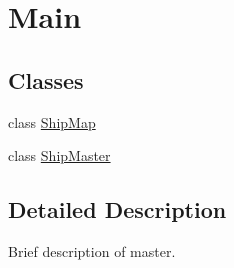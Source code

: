 \hypertarget{group__main}{\section{Main}
\label{group__main}
}
\subsection*{Classes}
\begin{DoxyCompactItemize}
\item 
class \hyperlink{classShipMap}{Ship\-Map}
\item 
class \hyperlink{classShipMaster}{Ship\-Master}
\end{DoxyCompactItemize}


\subsection{Detailed Description}
Brief description of master. 